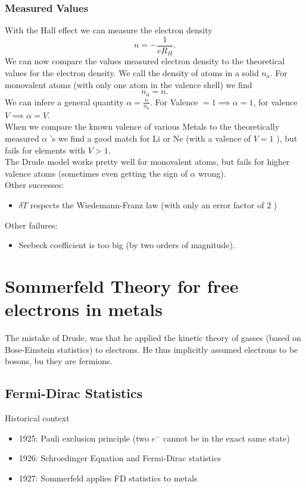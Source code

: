 \documentclass{report}
\begin{document}
\subsection{Measured Values}
With the Hall effect we can measure the electron density \[
n = -\frac{1}{eR_H}
.\] We can now compare the values measured electron density to the theoretical values for the electron density. We call the density of atoms in a solid $n_a$. For monovalent atoms (with only one atom in the valence shell) we find  \[
n_a = n
.\] We can infere a general quantity $\alpha = \frac{n}{n_a}$. For Valence $= 1 \implies \alpha = 1$, for valence $V \implies \alpha = V$.\\
When we compare the known valence of various Metals to the theoretically measured $\alpha$ 's we find a good match for Li or Ne (with a valence of $V = 1$ ), but fails for elements with $V > 1$.\\
The Drude model works pretty well for monovalent atoms, but fails for higher valence atoms (sometimes even getting the sign of $\alpha$ wrong).\\
Other successes: 
\begin{itemize}
	\item $\delta T$ respects the Wiedemann-Franz law (with only an error factor of $2$ )
\end{itemize}
Other failures:
\begin{itemize}
	\item Seebeck coefficient is too big (by two orders of magnitude).
\end{itemize}

\chapter{Sommerfeld Theory for free electrons in metals}
The mistake of Drude, was that he applied the kinetic theory of gasses (based on Bose-Einstein statistics) to electrons. He thus implicitly assumed electrons to be bosons, bu they are fermions.\\
\section{Fermi-Dirac Statistics}
Historical context
\begin{itemize}
	\item 1925: Pauli exclusion principle (two $e^{-}$ cannot be in the exact same state)
	\item 1926: Schroedinger Equation and Fermi-Dirac statistics
	\item 1927: Sommerfeld applies FD statistics to metals
\end{itemize}
\end{document}

